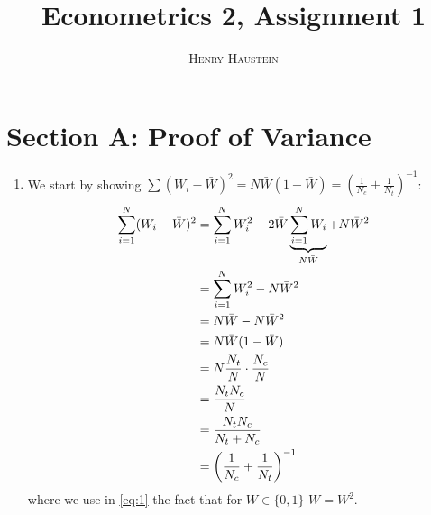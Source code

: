 \documentclass{article}
\title{\textbf{Econometrics 2, Assignment 1}}
\author{\textsc{Henry Haustein}}
\date{}
\begin{document}
	\maketitle
	
	\section*{Section A: Proof of Variance}
	\begin{enumerate}[label=(\alph*)]
		\item We start by showing $\sum (W_i-\bar{W})^2 = N\bar{W}(1-\bar{W}) = \left(\frac{1}{N_c} + \frac{1}{N_t}\right)^{-1}$:
		\begin{align}
			\sum_{i=1}^N (W_i-\bar{W})^2 &= \sum_{i=1}^N W_i^2 - 2\bar{W}\underbrace{\sum_{i=1}^N W_i}_{N\bar{W}} + N\bar{W}^2 \notag \\
			&= \sum_{i=1}^N W_i^2 - N\bar{W}^2 \notag \\
			&= N\bar{W} - N\bar{W}^2 \label{eq:1} \\
			&= N\bar{W}(1-\bar{W}) \notag \\
			&= N\frac{N_t}{N}\cdot\frac{N_c}{N} \notag \\
			&= \frac{N_tN_c}{N} \label{eq:2} \\
			&= \frac{N_tN_c}{N_t+N_c} \notag \\
			&= \left(\frac{1}{N_c} + \frac{1}{N_t}\right)^{-1} \notag
		\end{align}
		where we use in \eqref{eq:1} the fact that for $W\in\{0,1\}$ $W = W^2$.
		

\end{enumerate}
\end{document}
